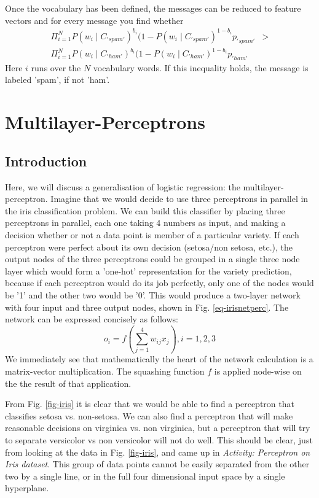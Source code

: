 Once the vocabulary has been defined, the messages can be reduced to feature vectors and
for every message you find whether
\begin{align}
\Pi^N_{i=1} P(w_i \mid C_{'spam'})^{b_i}(1 - P(w_i \mid C_{'spam'})^{1 - b_i}p_{'spam'}& > \\ \nonumber 
\Pi^N_{i=1}P(w_i \mid C_{'ham'})^{b_i}(1 - P(w_i \mid C_{'ham'})^{1 - b_i}p_{'ham'} &
\end{align}
Here $i$ runs over the $N$ vocabulary words. If this inequality holds, the message is labeled 'spam',
if not 'ham'.

\chapter{Multilayer-Perceptrons}
  \section{Introduction}

  Here, we will discuss a generalisation of logistic regression: the multilayer-perceptron. Imagine that we would decide to use three perceptrons in parallel in the
  iris classification problem.
  We can build this classifier by placing three perceptrons in parallel, each one taking 4 numbers as input,
  and making a decision whether or not a data point is member of a particular variety.  If each perceptron were perfect about its own decision (setosa/non setosa, etc.), the
  output nodes of the three perceptrons could be grouped in a single three node layer which would form a 'one-hot' representation for the variety prediction, because
  if each perceptron would do its job perfectly, only one of the nodes would be '1' and the other two would be '0'. This would produce a two-layer network with four input and
  three output nodes, shown in Fig. \ref{eq-irisnetperc}. The network can be expressed concisely as follows:
  \begin{equation}
    o_i = f( \sum^4_{j=1} w_{ij} x_j), i = 1,2,3
  \end{equation}
  We immediately see that mathematically the heart of the network calculation is a matrix-vector multiplication.  The squashing function $f$ is applied node-wise on the
  the result of that application.
  
  
  From Fig. \ref{fig-iris} it is clear that we would be able to find a perceptron that classifies setosa vs. non-setosa. We can also find a perceptron that will
  make reasonable decisions on virginica vs. non virginica, but a perceptron that will try to separate versicolor vs non versicolor will not do well.
  This should be clear, just from looking at the data in Fig. \ref{fig-iris}, and came up in \emph{Activity: Perceptron on Iris dataset}. This group of data points
  cannot be easily separated from the other two by a single line, or in the full four dimensional input space by a single hyperplane.

